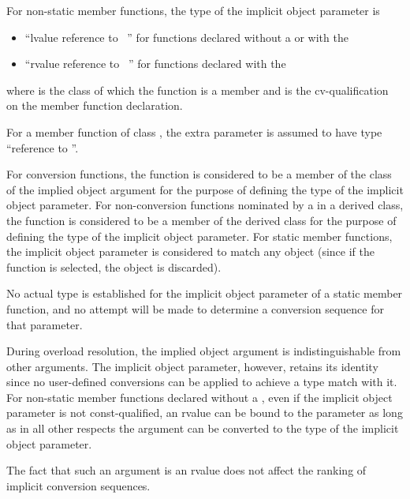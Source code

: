 \pnum
For non-static member functions, the type of the implicit object
parameter is
\begin{itemize}
\item ``lvalue reference to \cv{}~'' for functions declared
without a  or with the
\tcode{\&} 
\item ``rvalue reference to \cv{}~'' for functions declared with the
\tcode{\&\&} 
\end{itemize}
where
is the class of which the function is a member and
\cv{}
is the cv-qualification on the
member function declaration.
\begin{example}
For a
member
function of class
,
the extra parameter is assumed to have type
``reference to
''.
\end{example}
For conversion functions, the function is considered to be a member of the
class of the implied object argument for the purpose of defining the
type of the implicit object parameter.
For non-conversion functions
nominated by a 
in a derived class, the function is
considered to be a member of the derived class for the purpose of defining
the type of the implicit object parameter.
For static member functions, the implicit object parameter is considered
to match any object (since if the function is selected, the object is
discarded).
\begin{note}
No actual type is established for the implicit object parameter
of a static member function, and no attempt will be made to determine a
conversion sequence for that parameter.
\end{note}

\pnum
{}%
During overload resolution, the implied object argument is
indistinguishable from other arguments.
The implicit object
parameter, however, retains its identity since
no user-defined conversions can be applied to achieve a type
match with it.
%
For non-static member functions declared without a ,
even if the implicit object parameter is not const-qualified,
an rvalue can be bound to the parameter
as long as in all other respects the argument can be
converted to the type of the implicit object parameter.
\begin{note}
The fact that such an argument is an rvalue does not
affect the ranking of implicit conversion sequences.
\end{note}

